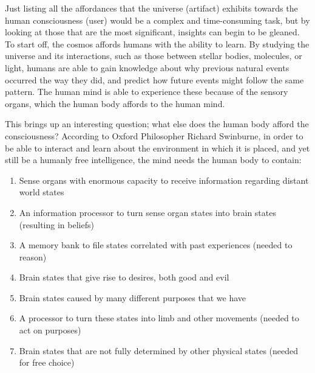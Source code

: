 Just listing all the affordances that the universe (artifact) exhibits
towards the human consciousness (user) would be a complex and
time-consuming task, but by looking at those that are the most
significant, insights can begin to be gleaned. To start off, the cosmos
affords humans with the ability to learn. By studying the universe and
its interactions, such as those between stellar bodies, molecules, or
light, humans are able to gain knowledge about why previous natural
events occurred the way they did, and predict how future events might
follow the same pattern. The human mind is able to experience these
because of the sensory organs, which the human body affords to the
human mind.

This brings up an interesting question; what else does the human body
afford the consciousness? According to Oxford Philosopher Richard
Swinburne\citep[][pg. 169]{swinburne2004}, in order to be able to interact and
learn about the environment in which it is placed, and yet still be a
humanly free intelligence, the mind needs the human body to contain:

\begin{enumerate}
\item Sense organs with enormous capacity to receive information regarding
distant world states
\item An information processor to turn sense organ states into brain states
(resulting in beliefs)
\item A memory bank to file states correlated with past experiences (needed
to reason)
\item Brain states that give rise to desires, both good and evil
\item Brain states caused by many different purposes that we have
\item A processor to turn these states into limb and other movements
(needed to act on purposes)
\item Brain states that are not fully determined by other physical states
(needed for free choice)
\end{enumerate}

